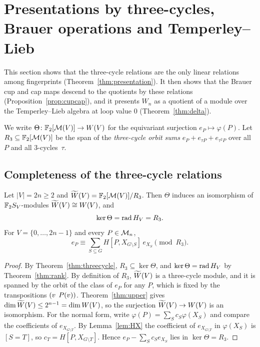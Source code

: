 \section{Presentations by three-cycles, Brauer operations and Temperley--Lieb}\label{sec:presentations} %

This section shows that the three-cycle relations are the only linear relations among fingerprints (Theorem~\ref{thm:presentation}). It then shows that the Brauer cup and cap maps descend to the quotients by these relations (Proposition~\ref{prop:cupcap}), and it presents $W_n$ as a quotient of a module over the Temperley--Lieb algebra at loop value $0$ (Theorem~\ref{thm:delta}). %

We write $\Theta\colon\mathbb{F}_2[\mathcal{M}(V)]\to W(V)$ for the equivariant surjection $e_P\mapsto\varphi(P)$. Let $R_3\subseteq\mathbb{F}_2[\mathcal{M}(V)]$ be the span of the \emph{three-cycle orbit sums} $e_P+e_{\tau P}+e_{\tau^{2}P}$ over all $P$ and all $3$-cycles~$\tau$.

\subsection{Completeness of the three-cycle relations}\label{subsec:complete}

\begin{theorem}\label{thm:presentation}
Let $|V|=2n\ge2$ and $\widetilde{W}(V)=\mathbb{F}_2[\mathcal{M}(V)]/R_3$. Then $\Theta$ induces an isomorphism of $\mathbb{F}_2 S_V$-modules $\widetilde{W}(V)\cong W(V)$, and
\[
\ker\Theta=\operatorname{rad} H_V=R_3 .
\]
For $V=\{0,\dots,2n-1\}$ and every $P\in\mathcal{M}_n$,
\[
e_P\equiv\sum_{S\subseteq G}H[P,X_{G\setminus S}]\,e_{X_S}\pmod{R_3}.
\]
\end{theorem}

\begin{proof}
By Theorem~\ref{thm:threecycle}, $R_3\subseteq\ker\Theta$, and $\ker\Theta=\operatorname{rad} H_V$ by Theorem~\ref{thm:rank}. By definition of $R_3$, $\widetilde{W}(V)$ is a three-cycle module, and it is spanned by the orbit of the class of $e_{P}$ for any $P$, which is fixed by the transpositions $(v\;\,P(v))$. Theorem~\ref{thm:upper} gives $\dim\widetilde{W}(V)\le2^{n-1}=\dim W(V)$, so the surjection $\widetilde{W}(V)\to W(V)$ is an isomorphism. For the normal form, write $\varphi(P)=\sum_{S}c_S\varphi(X_S)$ and compare the coefficients of $e_{X_{G\setminus T}}$. By Lemma~\ref{lem:HX} the coefficient of $e_{X_{G\setminus T}}$ in $\varphi(X_S)$ is $[S=T]$, so $c_T=H[P,X_{G\setminus T}]$. Hence $e_P-\sum_{S}c_{S}e_{X_S}$ lies in $\ker\Theta=R_3$.
\end{proof}

